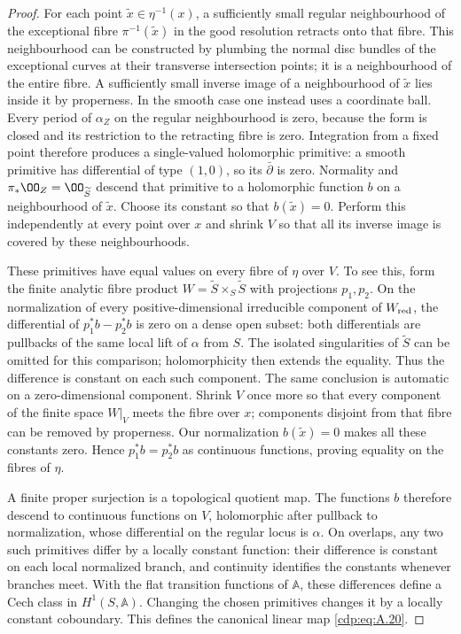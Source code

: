 \begin{proof}
For each point $\widetilde x\in\eta^{-1}(x)$, a sufficiently small regular neighbourhood of the exceptional fibre $\pi^{-1}(\widetilde x)$ in the good resolution retracts onto that fibre. This neighbourhood can be constructed by plumbing the normal disc bundles of the exceptional curves at their transverse intersection points; it is a neighbourhood of the entire fibre. A sufficiently small inverse image of a neighbourhood of $\widetilde x$ lies inside it by properness. In the smooth case one instead uses a coordinate ball. Every period of $\alpha_Z$ on the regular neighbourhood is zero, because the form is closed and its restriction to the retracting fibre is zero. Integration from a fixed point therefore produces a single-valued holomorphic primitive: a smooth primitive has differential of type $(1,0)$, so its $\bar\partial$ is zero. Normality and $\pi_*\OO_Z=\OO_{\widetilde S}$ descend that primitive to a holomorphic function $b$ on a neighbourhood of $\widetilde x$. Choose its constant so that $b(\widetilde x)=0$. Perform this independently at every point over $x$ and shrink $V$ so that all its inverse image is covered by these neighbourhoods.

These primitives have equal values on every fibre of $\eta$ over $V$. To see this, form the finite analytic fibre product
$W=\widetilde S\times_S\widetilde S$ with projections $p_1,p_2$. On the normalization of every positive-dimensional irreducible component of $W_{\rm red}$, the differential of $p_1^*b-p_2^*b$ is zero on a dense open subset: both differentials are pullbacks of the same local lift of $\alpha$ from $S$. The isolated singularities of $\widetilde S$ can be omitted for this comparison; holomorphicity then extends the equality. Thus the difference is constant on each such component. The same conclusion is automatic on a zero-dimensional component. Shrink $V$ once more so that every component of the finite space $W|_V$ meets the fibre over $x$; components disjoint from that fibre can be removed by properness. Our normalization $b(\widetilde x)=0$ makes all these constants zero. Hence $p_1^*b=p_2^*b$ as continuous functions, proving equality on the fibres of $\eta$.

A finite proper surjection is a topological quotient map. The functions $b$ therefore descend to continuous functions on $V$, holomorphic after pullback to normalization, whose differential on the regular locus is $\alpha$. On overlaps, any two such primitives differ by a locally constant function: their difference is constant on each local normalized branch, and continuity identifies the constants whenever branches meet. With the flat transition functions of $\mathbb A$, these differences define a Cech class in $H^1(S,\mathbb A)$. Changing the chosen primitives changes it by a locally constant coboundary. This defines the canonical linear map \eqref{cdp:eq:A.20}.


\end{proof}
